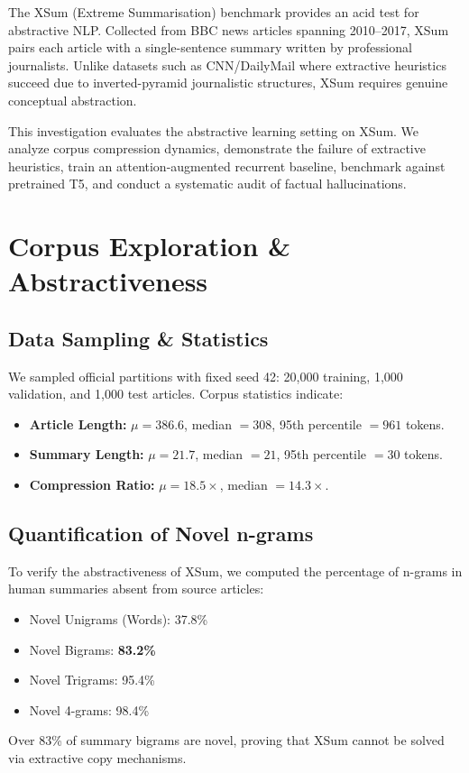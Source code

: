 \documentclass[conference]{IEEEtran}
\begin{document}
The XSum (Extreme Summarisation) benchmark provides an acid test for abstractive NLP. Collected from BBC news articles spanning 2010--2017, XSum pairs each article with a single-sentence summary written by professional journalists. Unlike datasets such as CNN/DailyMail where extractive heuristics succeed due to inverted-pyramid journalistic structures, XSum requires genuine conceptual abstraction.

This investigation evaluates the abstractive learning setting on XSum. We analyze corpus compression dynamics, demonstrate the failure of extractive heuristics, train an attention-augmented recurrent baseline, benchmark against pretrained T5, and conduct a systematic audit of factual hallucinations.

\section{Corpus Exploration \& Abstractiveness}
\subsection{Data Sampling \& Statistics}
We sampled official partitions with fixed seed 42: 20,000 training, 1,000 validation, and 1,000 test articles. Corpus statistics indicate:
\begin{itemize}
    \item \textbf{Article Length:} $\mu = 386.6$, median $= 308$, 95th percentile $= 961$ tokens.
    \item \textbf{Summary Length:} $\mu = 21.7$, median $= 21$, 95th percentile $= 30$ tokens.
    \item \textbf{Compression Ratio:} $\mu = 18.5\times$, median $= 14.3\times$.
\end{itemize}

\subsection{Quantification of Novel n-grams}
To verify the abstractiveness of XSum, we computed the percentage of n-grams in human summaries absent from source articles:
\begin{itemize}
    \item Novel Unigrams (Words): 37.8\%
    \item Novel Bigrams: \textbf{83.2\%}
    \item Novel Trigrams: 95.4\%
    \item Novel 4-grams: 98.4\%
\end{itemize}
Over 83\% of summary bigrams are novel, proving that XSum cannot be solved via extractive copy mechanisms.
\end{document}
